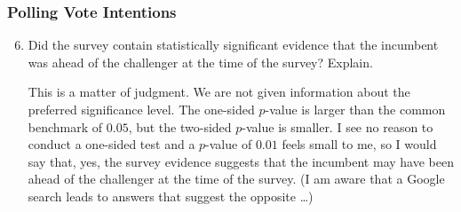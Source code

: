 \begin{frame}
\frametitle{Polling Vote Intentions}
\ask
\begin{enumerate}\setcounter{enumi}{5}

\item Did the survey contain statistically significant evidence that the incumbent was ahead of the challenger at the time of the survey? Explain.

\begin{answer}
This is a matter of judgment. We are not given information about the preferred significance level. The one-sided $p$-value is larger than the common benchmark of $0.05$, but the two-sided $p$-value is smaller. I see no reason to conduct a one-sided test and a $p$-value of $0.01$ feels small to me, so I would say that, yes, the survey evidence suggests that the incumbent may have been ahead of the challenger at the time of the survey. (I am aware that a Google search leads to answers that suggest the opposite \ldots)
\end{answer}

\end{enumerate}
\end{frame}



